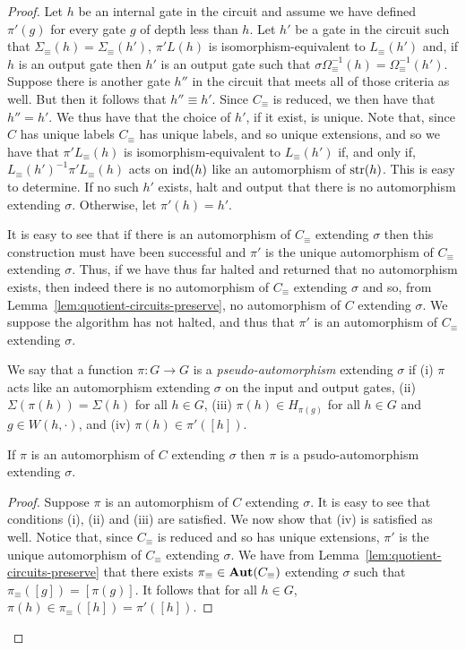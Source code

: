 \documentclass[../paper.tex]{subfiles}
\begin{document}
\begin{proof}
  Let $h$ be an internal gate in the circuit and assume we have defined
  $\pi'(g)$ for every gate $g$ of depth less than $h$. Let $h'$ be a gate in the
  circuit such that $\Sigma_\equiv(h) = \Sigma_\equiv (h')$, $\pi' L(h)$ is
  isomorphism-equivalent to $L_\equiv(h')$ and, if $h$ is an output gate then
  $h'$ is an output gate such that $\sigma \Omega^{-1}_\equiv(h) =
  \Omega^{-1}_\equiv(h')$. Suppose there is another gate $h''$ in the circuit
  that meets all of those criteria as well. But then it follows that $h'' \equiv
  h'$. Since $C_\equiv$ is reduced, we then have that $h'' = h'$. We thus have
  that the choice of $h'$, if it exist, is unique. Note that, since $C$ has
  unique labels $C_\equiv$ has unique labels, and so unique extensions, and so
  we have that $\pi' L_\equiv(h)$ is isomorphism-equivalent to $L_\equiv(h')$
  if, and only if, $L_\equiv(h')^{-1}\pi'L_\equiv(h)$ acts on $\text{\upshape ind}(h)$ like an
  automorphism of $\text{str}(h)$. This is easy to determine. If no such $h'$ exists,
  halt and output that there is no automorphism extending $\sigma$. Otherwise,
  let $\pi'(h) = h'$.

  It is easy to see that if there is an automorphism of $C_\equiv$ extending
  $\sigma$ then this construction must have been successful and $\pi'$ is the
  unique automorphism of $C_\equiv$ extending $\sigma$. Thus, if we have thus
  far halted and returned that no automorphism exists, then indeed there is no
  automorphism of $C_\equiv$ extending $\sigma$ and so, from
  Lemma~\ref{lem:quotient-circuits-preserve}, no automorphism of $C$ extending
  $\sigma$. We suppose the algorithm has not halted, and thus that $\pi'$ is an
  automorphism of $C_\equiv$ extending $\sigma$.

  We say that a function $\pi : G \rightarrow G$ is a \emph{pseudo-automorphism}
  extending $\sigma$ if (i) $\pi$ acts like an automorphism extending $\sigma$
  on the input and output gates, (ii) $\Sigma (\pi (h)) = \Sigma(h)$ for all $h
  \in G$, (iii) $\pi(h) \in H_{\pi(g)}$ for all $h \in G$ and $g \in W(h,
  \cdot)$, and (iv) $\pi (h) \in \pi'([h])$.

\begin{claim}
  If $\pi$ is an automorphism of $C$ extending $\sigma$ then $\pi$ is a
  psudo-automorphism extending $\sigma$.
\end{claim}
\begin{proof}
  Suppose $\pi$ is an automorphism of $C$ extending $\sigma$. It is easy to see
  that conditions (i), (ii) and (iii) are satisfied. We now show that (iv) is
  satisfied as well. Notice that, since $C_\equiv$ is reduced and so has unique
  extensions, $\pi'$ is the unique automorphism of $C_\equiv$ extending
  $\sigma$. We have from Lemma~\ref{lem:quotient-circuits-preserve} that there
  exists $\pi_\equiv \in \text{\textbf{Aut}}(C_\equiv)$ extending $\sigma$ such that
  $\pi_\equiv ([g]) = [\pi(g)]$. It follows that for all $h \in G$, $\pi(h) \in
  \pi_\equiv([h]) = \pi'([h])$.
\end{proof}


\end{proof}
\end{document}
